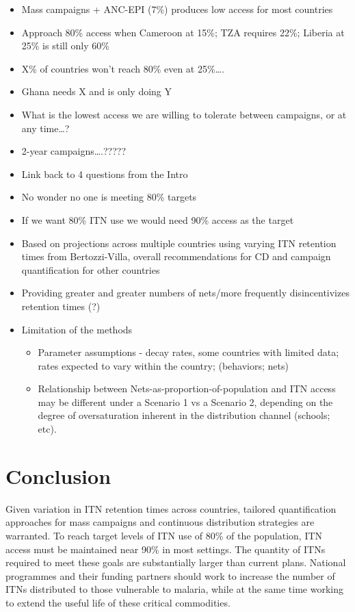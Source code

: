 \documentclass[review,
3p]{elsarticle} %
\providecommand{\tightlist}{%
  \setlength{\itemsep}{0pt}\setlength{\parskip}{0pt}}
\begin{document}
\begin{itemize}
\tightlist
\item
  Mass campaigns + ANC-EPI (7\%) produces low access for most countries
\item
  Approach 80\% access when Cameroon at 15\%; TZA requires 22\%; Liberia
  at 25\% is still only 60\%
\item
  X\% of countries won't reach 80\% even at 25\%\ldots.
\item
  Ghana needs X and is only doing Y
\item
  What is the lowest access we are willing to tolerate between
  campaigns, or at any time\ldots?
\item
  2-year campaigns\ldots.?????
\item
  Link back to 4 questions from the Intro
\item
  No wonder no one is meeting 80\% targets
\item
  If we want 80\% ITN use we would need 90\% access as the target
\item
  Based on projections across multiple countries using varying ITN
  retention times from Bertozzi-Villa, overall recommendations for CD
  and campaign quantification for other countries
\item
  Providing greater and greater numbers of nets/more frequently
  disincentivizes retention times (?)
\item
  Limitation of the methods

  \begin{itemize}
  \tightlist
  \item
    Parameter assumptions - decay rates, some countries with limited
    data; rates expected to vary within the country; (behaviors; nets)
  \item
    Relationship between Nets-as-proportion-of-population and ITN access
    may be different under a Scenario 1 vs a Scenario 2, depending on
    the degree of oversaturation inherent in the distribution channel
    (schools; etc).
  \end{itemize}
\end{itemize}

\hypertarget{conclusion}{%
\section{Conclusion}\label{conclusion}}

Given variation in ITN retention times across countries, tailored
quantification approaches for mass campaigns and continuous distribution
strategies are warranted. To reach target levels of ITN use of 80\% of
the population, ITN access must be maintained near 90\% in most
settings. The quantity of ITNs required to meet these goals are
substantially larger than current plans. National programmes and their
funding partners should work to increase the number of ITNs distributed
to those vulnerable to malaria, while at the same time working to extend
the useful life of these critical commodities.
\end{document}

